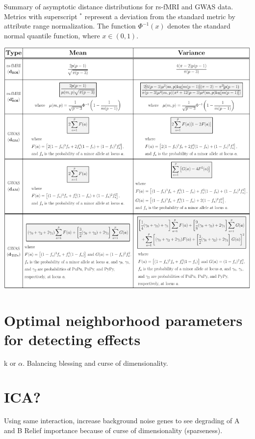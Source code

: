 \documentclass[10pt,letterpaper]{article}\usepackage[]{graphicx}\usepackage[]{color}
\begin{document}
\begin{table}[H]
\caption{Summary of asymptotic distance distributions for rs-fMRI and GWAS data. Metrics with superscript $^*$ represent a deviation from the standard metric by attribute range normalization. The function $\Phi^{-1}(x)$ denotes the standard normal quantile function, where $x \in (0,1)$.}
\label{tab:dist_distr_bio}
\centering
\includegraphics[width=\textwidth]{bioinformaticsy_tab.pdf}
\end{table}

\section{Optimal neighborhood parameters for detecting effects}
k or $\alpha$. 
Balancing blessing and curse of dimensionality.


\section{ICA?}

Using same interaction, increase background noise genes to see degrading of A and B Relief importance because of curse of dimensionality (sparseness).  


\end{document}
